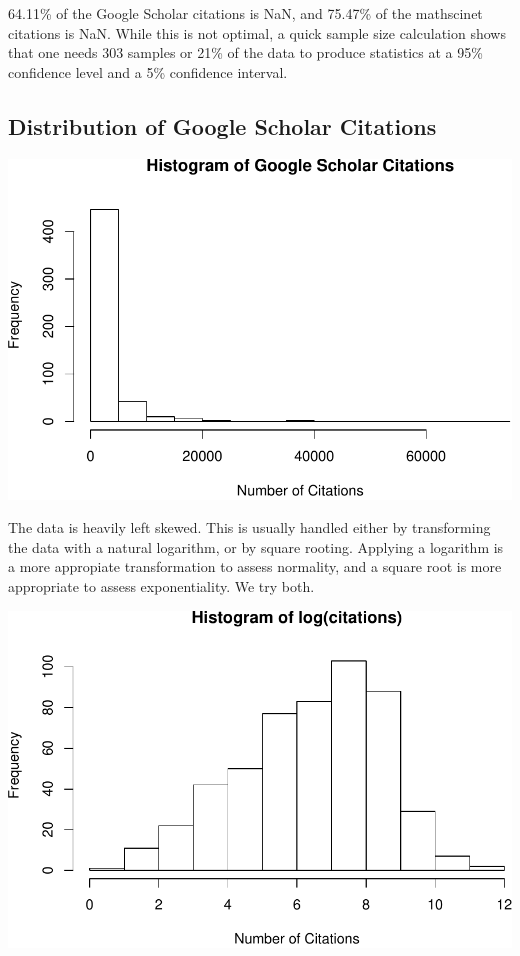 \documentclass[]{article}
\begin{document}
64.11\% of the Google Scholar citations is NaN, and 75.47\% of the
mathscinet citations is NaN. While this is not optimal, a quick sample
size calculation shows that one needs 303 samples or 21\% of the data to
produce statistics at a 95\% confidence level and a 5\% confidence
interval.

\hypertarget{distribution-of-google-scholar-citations}{%
\subsection{Distribution of Google Scholar
Citations}\label{distribution-of-google-scholar-citations}}

\includegraphics{final_files/figure-latex/unnamed-chunk-4-1.pdf}

The data is heavily left skewed. This is usually handled either by
transforming the data with a natural logarithm, or by square rooting.
Applying a logarithm is a more appropiate transformation to assess
normality, and a square root is more appropriate to assess
exponentiality. We try both.

\includegraphics{final_files/figure-latex/unnamed-chunk-5-1.pdf}
\end{document}

